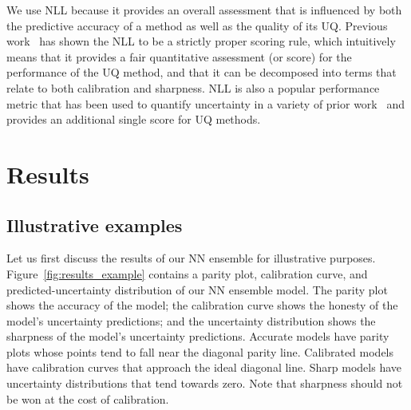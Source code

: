 \documentclass[]{achemso}
\begin{document}
We use \gls{NLL} because it provides an overall assessment that is influenced by both the predictive accuracy of a method as well as the quality of its \gls{UQ}.
Previous work~\cite{Gneiting2007, Dawid2014} has shown the \gls{NLL} to be a strictly proper scoring rule, which intuitively means that it provides a fair quantitative assessment (or score) for the performance of the \gls{UQ} method, and that it can be decomposed into terms that relate to both calibration and sharpness.
\gls{NLL} is also a popular performance metric that has been used to quantify uncertainty in a variety of prior work~\cite{Lakshminarayanan2017} and provides an additional single score for \gls{UQ} methods.



\section{Results}

\subsection{Illustrative examples}

Let us first discuss the results of our \gls{NN} ensemble for illustrative purposes.
Figure~\ref{fig:results_example} contains a parity plot, calibration curve, and predicted-uncertainty distribution of our \gls{NN} ensemble model.
The parity plot shows the accuracy of the model; the calibration curve shows the honesty of the model's uncertainty predictions; and the uncertainty distribution shows the sharpness of the model's uncertainty predictions.
Accurate models have parity plots whose points tend to fall near the diagonal parity line.
Calibrated models have calibration curves that approach the ideal diagonal line.
Sharp models have uncertainty distributions that tend towards zero.
Note that sharpness should not be won at the cost of calibration.
\end{document}
